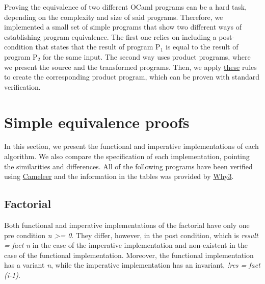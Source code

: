 \iffalse
Proving the equivalence of two different OCaml programs can be a hard task, depending on the complexity and size of said programs.
Therefore, we implemented a small set of simple programs that show two different ways of establishing program equivalence.
The first one relies on including a post-condition that states that the result of program P$_1$ is equal to the result of program P$_2$ for the same input.
The second way uses product programs, where we present the source and the transformed programs.
Then, we apply \hyperref[fig:product_construction_equal_struct]{these} rules to create the corresponding product program, which can be proven with standard verification.

\FloatBarrier
\section{Simple equivalence proofs}
\label{sec:results_eq_proofs}

In this section, we present the functional and imperative implementations of each algorithm.
We also compare the specification of each implementation, pointing the similarities and differences.
All of the following programs have been verified using \hyperref[sec:cameleer]{Cameleer} and the information in the tables was provided by \hyperref[sec:why3]{Why3}.


\subsection{Factorial}
\label{sub:factorial}

Both functional and imperative implementations of the factorial have only one pre condition \emph{n >= 0}.
They differ, however, in the post condition, which is \emph{result = fact n} in the case of the imperative implementation and non-existent in the case of the functional implementation.
Moreover, the functional implementation has a variant \emph{n}, while the imperative implementation has an invariant, \emph{!res = fact (i-1)}. 

\bigskip
\newcommand{\provername}[1]{\cellcolor{yellow!25}
\begin{sideways}\textbf{#1}~~\end{sideways}}
\newcommand{\explanation}[1]{\cellcolor{yellow!13}lemma \texttt{#1}}
\newcommand{\transformation}[1]{\cellcolor{yellow!13}transformation \texttt{#1}}
\newcommand{\subgoal}[2]{\cellcolor{yellow!13}subgoal #2}
\newcommand{\valid}[1]{\cellcolor{green!13}#1}
\newcommand{\unknown}[1]{\cellcolor{red!20}#1}
\newcommand{\invalid}[1]{\cellcolor{red!50}#1}
\newcommand{\timeout}[1]{\cellcolor{red!20}(#1)}
\newcommand{\outofmemory}[1]{\cellcolor{red!20}(#1)}
\newcommand{\noresult}{\multicolumn{1}{>{\columncolor[gray]{0.8}}c|}{~}}
\newcommand{\highfailure}{\cellcolor{red!50}FAILURE}
    
